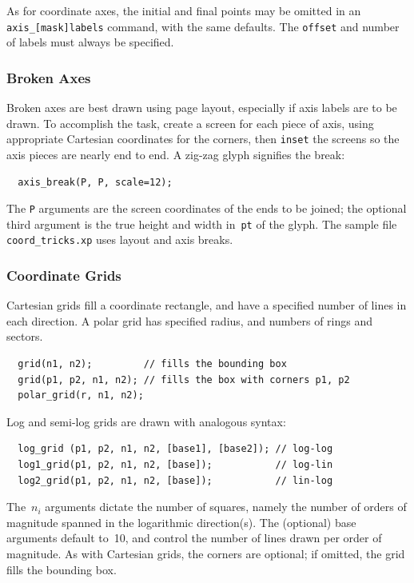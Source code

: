 \documentclass[12pt,letterpaper]{book}
\newcommand{\code}[1]{\texttt{#1}}
\newcommand{\filename}[1]{\texttt{#1}}
\newcommand{\teximath}[1]{$#1$}
\newcommand{\findex}[1]{\ignorespaces}
\begin{document}
As for coordinate axes, the initial and final points may be omitted in
an \code{axis\_[mask]labels} command, with the same defaults.  The
\code{offset} and number of labels must always be specified.


\subsubsection*{Broken Axes}

Broken axes are best drawn using page layout, especially if axis
labels are to be drawn. To accomplish the task, create a screen for
each piece of axis, using appropriate Cartesian coordinates for the
corners, then \code{inset} the screens so the axis pieces are nearly
end to end. A zig-zag glyph signifies the break:
\findex{axis\_break}
\begin{verbatim}
  axis_break(P, P, scale=12);
\end{verbatim}
The \code{P} arguments are the screen coordinates of the ends to be
joined; the optional third argument is the true height and width
in~\code{pt} of the glyph. The sample file \filename{coord\_tricks.xp}
uses layout and axis breaks.


\subsubsection*{Coordinate Grids}

Cartesian grids fill a coordinate rectangle, and have a specified
number of lines in each direction. A polar grid has specified radius,
and numbers of rings and sectors.
\findex{grid}
\findex{polar\_grid}
\begin{verbatim}
  grid(n1, n2);         // fills the bounding box
  grid(p1, p2, n1, n2); // fills the box with corners p1, p2
  polar_grid(r, n1, n2);
\end{verbatim}

Log and semi-log grids are drawn with analogous syntax:
\findex{log\_grid}
\findex{log1\_grid}
\findex{log2\_grid}
\begin{verbatim}
  log_grid (p1, p2, n1, n2, [base1], [base2]); // log-log
  log1_grid(p1, p2, n1, n2, [base]);           // log-lin
  log2_grid(p1, p2, n1, n2, [base]);           // lin-log
\end{verbatim}
The~\teximath{n_i} arguments dictate the number of squares, namely the number
of orders of magnitude spanned in the logarithmic direction(s).  The
(optional) base arguments default to~10, and control the number of
lines drawn per order of magnitude. As with Cartesian grids, the
corners are optional; if omitted, the grid fills the bounding box.
\end{document}
